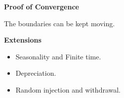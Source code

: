 \documentclass{beamer}
\begin{document}

\begin{frame}
{\bf Proof of Convergence}
\begin{Theorem}
The boundaries can be kept moving.
\end{Theorem}
\end{frame}


\begin{frame}
{\bf Extensions}

\begin{itemize}
  \item Seasonality and Finite time.
  \item Depreciation.
  \item Random injection and withdrawal.
\end{itemize}

\end{frame}
\end{document}
